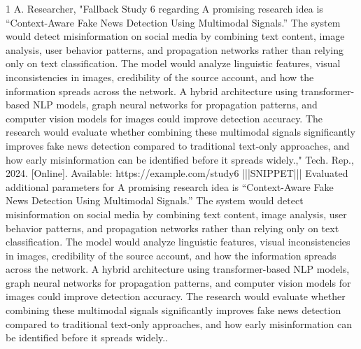 \documentclass[conference]{IEEEtran}
\begin{document}
\begin{thebibliography}{1}
A. Researcher, "Fallback Study 6 regarding A promising research idea is “Context-Aware Fake News Detection Using Multimodal Signals.” The system would detect misinformation on social media by combining text content, image analysis, user behavior patterns, and propagation networks rather than relying only on text classification. The model would analyze linguistic features, visual inconsistencies in images, credibility of the source account, and how the information spreads across the network. A hybrid architecture using transformer-based NLP models, graph neural networks for propagation patterns, and computer vision models for images could improve detection accuracy. The research would evaluate whether combining these multimodal signals significantly improves fake news detection compared to traditional text-only approaches, and how early misinformation can be identified before it spreads widely.," Tech. Rep., 2024. [Online]. Available: https://example.com/study6 |||SNIPPET||| Evaluated additional parameters for A promising research idea is “Context-Aware Fake News Detection Using Multimodal Signals.” The system would detect misinformation on social media by combining text content, image analysis, user behavior patterns, and propagation networks rather than relying only on text classification. The model would analyze linguistic features, visual inconsistencies in images, credibility of the source account, and how the information spreads across the network. A hybrid architecture using transformer-based NLP models, graph neural networks for propagation patterns, and computer vision models for images could improve detection accuracy. The research would evaluate whether combining these multimodal signals significantly improves fake news detection compared to traditional text-only approaches, and how early misinformation can be identified before it spreads widely..

\end{thebibliography}
\end{document}
